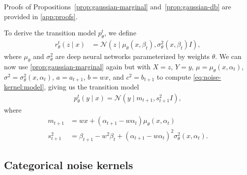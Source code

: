 \documentclass[10pt,twocolumn,letterpaper]{article}
\begin{document}
Proofs of Propositions~\ref{prop:gaussian-marginal} and~\ref{prop:gaussian-db} are provided in \cref{app:proofs}.

To derive the transition model $p^{t}_{\theta}$, we define
\begin{align}
  \label{eq:nk:continuous:denoising}
  r^{t}_{\theta}(z \mid x)
  & = \mathcal{N}\left(z \mid \mu_{\theta}(x, \beta_{t}), \sigma^{2}_{\theta}(x, \beta_{t}) I\right)
    ,
\end{align}
where $\mu_{\theta}$ and $\sigma_{\theta}^{2}$ are deep neural networks parameterized by weights $\theta$.
We can now use \cref{prop:gaussian-marginal} again but with $X = z$, $Y = y$, $\mu = \mu_{\theta}(x, \alpha_{t})$, $\sigma^{2} = \sigma_{\theta}^{2}(x, \alpha_{t})$, $a = a_{t+1}$, $b = wx$, and $c^{2} = b_{t+1}$ to compute \cref{eq:noise-kernel:model}, giving us the transition model
\begin{align}
  p^{t}_{\theta}(y \mid x) = \mathcal{N}( y \mid m_{t+1}, s_{t+1}^{2} I),
\end{align}
where
\begin{align}
  m_{t+1}
  & = w x + (\alpha_{t+1} - w \alpha_{t}) \mu_{\theta}(x, \alpha_{t})
    \label{eq:nk:continuous:mean}
  \\
  s_{t+1}^{2}
  & = \beta_{t+1} - w^{2}\beta_{t} + (\alpha_{t+1} - w \alpha_{t})^{2} \sigma^{2}_{\theta}(x, \alpha_{t})
    \label{eq:nk:continuous:variance}
    .
\end{align}

\subsection{Categorical noise kernels}\label{sec:nk:categorical}
\end{document}

